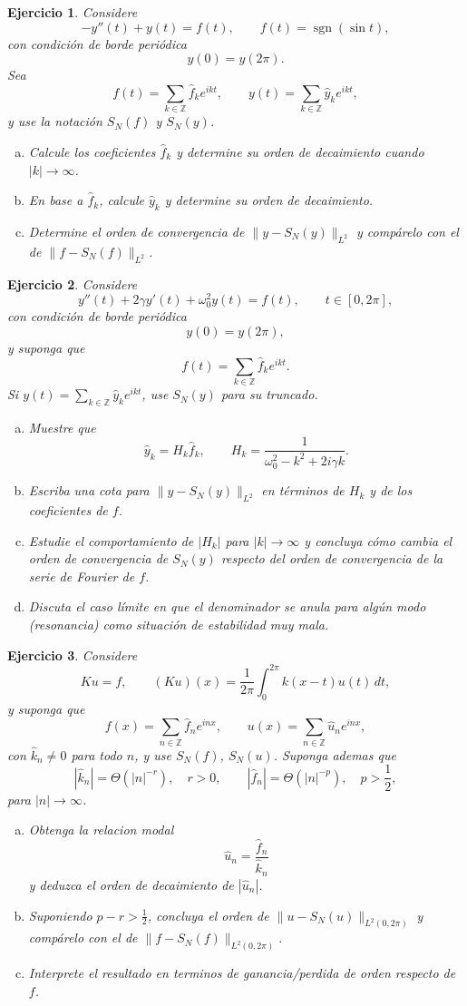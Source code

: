\documentclass[12pt]{article}
\newtheorem{exercise}{Ejercicio}
\newcommand{\bej}{\begin{exercise}\rm}
\newcommand{\fej}{\end{exercise}}
\begin{document}
\bej
Considere
\[
-y''(t)+y(t)=f(t),\qquad f(t)=\operatorname{sgn}(\sin t),
\]
con condición de borde periódica
\[
y(0)=y(2\pi).
\]
Sea
\[
f(t)=\sum_{k\in\mathbb Z}\hat f_k e^{ikt},
\qquad
y(t)=\sum_{k\in\mathbb Z}\hat y_k e^{ikt},
\]
y use la notación $S_N(f)$ y $S_N(y)$.
\begin{enumerate}[(a)]
    \item Calcule los coeficientes $\hat f_k$ y determine su orden de decaimiento cuando $|k|\to\infty$.
    \item En base a $\hat f_k$, calcule $\hat y_k$ y determine su orden de decaimiento.
    \item Determine el orden de convergencia de $\|y-S_N(y)\|_{L^2}$ y compárelo con el de $\|f-S_N(f)\|_{L^2}$.
\end{enumerate}
\fej

\bej
Considere
\[
y''(t)+2\gamma y'(t)+\omega_0^2y(t)=f(t),\qquad t\in[0,2\pi],
\]
con condición de borde periódica
\[
y(0)=y(2\pi),
\]
y suponga que
\[
f(t)=\sum_{k\in\mathbb Z}\hat f_k e^{ikt}.
\]
Si $y(t)=\sum_{k\in\mathbb Z}\hat y_k e^{ikt}$, use $S_N(y)$ para su truncado.
\begin{enumerate}[(a)]
    \item Muestre que
    \[
    \hat y_k=H_k\hat f_k,\qquad H_k=\frac{1}{\omega_0^2-k^2+2i\gamma k}.
    \]
    \item Escriba una cota para $\|y-S_N(y)\|_{L^2}$ en términos de $H_k$ y de los coeficientes de $f$.
    \item Estudie el comportamiento de $|H_k|$ para $|k|\to\infty$ y concluya cómo cambia el orden de convergencia de $S_N(y)$ respecto del orden de convergencia de la serie de Fourier de $f$.
    \item Discuta el caso límite en que el denominador se anula para algún modo (resonancia) como situación de estabilidad muy mala.
\end{enumerate}
\fej

\bej
Considere
\[
Ku=f,
\qquad
(Ku)(x)=\frac{1}{2\pi}\int_0^{2\pi}k(x-t)u(t)\,dt,
\]
y suponga que
\[
f(x)=\sum_{n\in\mathbb Z}\hat f_n e^{inx},
\qquad
u(x)=\sum_{n\in\mathbb Z}\hat u_n e^{inx},
\]
con $\hat k_n\neq 0$ para todo $n$, y use $S_N(f)$, $S_N(u)$.
Suponga ademas que
\[
|\hat k_n|=\Theta(|n|^{-r}),\quad r>0,
\qquad
|\hat f_n|=\Theta(|n|^{-p}),\quad p>\frac12,
\]
para $|n|\to\infty$.
\begin{enumerate}[(a)]
    \item Obtenga la relacion modal
    \[
    \hat u_n=\frac{\hat f_n}{\hat k_n}
    \]
    y deduzca el orden de decaimiento de $|\hat u_n|$.
    \item Suponiendo $p-r>\frac12$, concluya el orden de $\|u-S_N(u)\|_{L^2(0,2\pi)}$ y compárelo con el de $\|f-S_N(f)\|_{L^2(0,2\pi)}$.
    \item Interprete el resultado en terminos de ganancia/perdida de orden respecto de $f$.
\end{enumerate}
\fej
\end{document}
